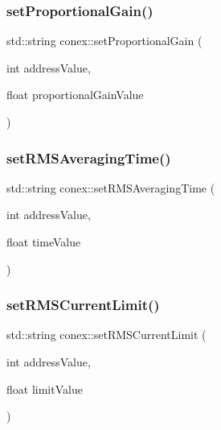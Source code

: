 \mbox{\label{namespaceconex_a852e0fb570af45c7d523f94a2b81b84b}} 
\subsubsection{\texorpdfstring{set\+Proportional\+Gain()}{setProportionalGain()}}
{\footnotesize\ttfamily std\+::string conex\+::set\+Proportional\+Gain (\begin{DoxyParamCaption}\item[{int}]{address\+Value,  }\item[{float}]{proportional\+Gain\+Value }\end{DoxyParamCaption})}

\mbox{\label{namespaceconex_a4db096ebf48bf2512a51c6f16f6d05a5}} 
\subsubsection{\texorpdfstring{set\+R\+M\+S\+Averaging\+Time()}{setRMSAveragingTime()}}
{\footnotesize\ttfamily std\+::string conex\+::set\+R\+M\+S\+Averaging\+Time (\begin{DoxyParamCaption}\item[{int}]{address\+Value,  }\item[{float}]{time\+Value }\end{DoxyParamCaption})}

\mbox{\label{namespaceconex_a3552f23ef324fc207a4b8ea8ca79d63c}} 
\subsubsection{\texorpdfstring{set\+R\+M\+S\+Current\+Limit()}{setRMSCurrentLimit()}}
{\footnotesize\ttfamily std\+::string conex\+::set\+R\+M\+S\+Current\+Limit (\begin{DoxyParamCaption}\item[{int}]{address\+Value,  }\item[{float}]{limit\+Value }\end{DoxyParamCaption})}

